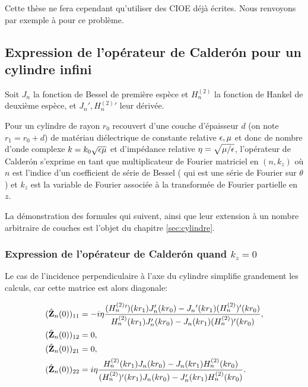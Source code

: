     Cette thèse ne fera cependant qu'utiliser des CIOE déjà écrites.
    Nous renvoyons par exemple à \cite{senior_approximate_1995} pour ce problème.

  \subsection{Expression de l'opérateur de Calderón pour un cylindre infini}

    Soit \(J_n\) la fonction de Bessel de première espèce et \(H_n^{(2)}\) la fonction de Hankel de deuxième espèce, et \(J_n', H_n^{(2)}{}'\) leur dérivée.

    Pour un cylindre de rayon \(r_0\) recouvert d'une couche d'épaisseur \(d\) (on note \(r_1=r_0 + d\)) de matériau diélectrique de constante relative \(\epsilon,\mu\) et donc de nombre d'onde complexe \(k = k_0\sqrt{\epsilon\mu}\) et d'impédance relative \(\eta=\sqrt{{\mu}/{\epsilon}}\), l'opérateur de Calderón s'exprime en tant que multiplicateur de Fourier matriciel en \((n,k_z)\) où \(n\) est l'indice d'un coefficient de série de Bessel ( qui est une série de Fourier sur \(\theta\) ) et \(k_z\) est la variable de Fourier associée à la transformée de Fourier partielle en \(z\).

    La démonstration des formules qui suivent, ainsi que leur extension à un nombre arbitraire de couches est l'objet du chapitre \ref{sec:cylindre}.

    \subsubsection{Expression de l'opérateur de Calderón quand \(k_z=0\)}
      Le cas de l'incidence perpendiculaire à l'axe du cylindre simplifie grandement les calculs, car cette matrice est alors diagonale:

      \begin{align*}
        (\hat{\mathbf{Z}}_n(0))_{11} &= -i\eta\dfrac{
          (H^{(2)}_n{}')(kr_1)J_n'(kr_0)-J_n{}'(kr_1)(H^{(2)}_n{})'(kr_0)
        }{
          H^{(2)}_n(kr_1)J_n'(kr_0)-J_n(kr_1)(H^{(2)}_n{})'(kr_0)
        },
        \\
        (\hat{\mathbf{Z}}_n(0))_{12} &= 0,
        \\
        (\hat{\mathbf{Z}}_n(0))_{21} &= 0,
        \\
        (\hat{\mathbf{Z}}_n(0))_{22} &=i\eta\dfrac{
            H^{(2)}_n(kr_1)J_n(kr_0)-J_n(kr_1)H^{(2)}_n(kr_0)
          }{
            (H^{(2)}_n{})'(kr_1)J_n(kr_0)-J_n'(kr_1)H^{(2)}_n(kr_0)
          }.
      \end{align*}

